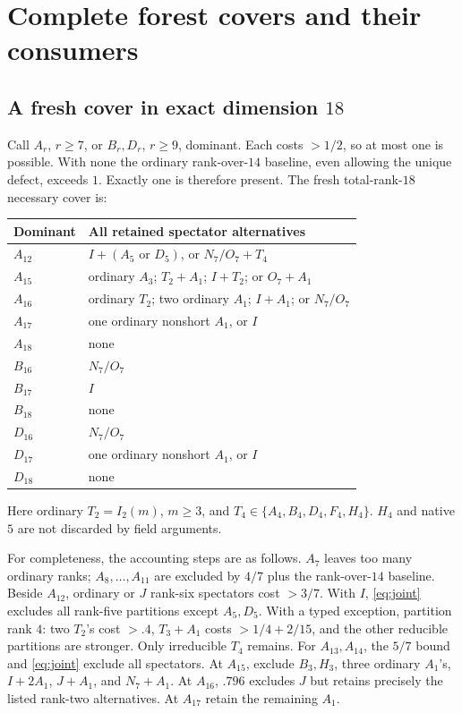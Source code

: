 \documentclass[11pt]{article}
\theoremstyle{definition}
\theoremstyle{remark}
\begin{document}
\section{Complete forest covers and their consumers}
\label{sec:forests}
\subsection[A fresh cover in exact dimension 18]{A fresh cover in exact dimension \(18\)}
Call \(A_r\), \(r\geq7\), or \(B_r,D_r\), \(r\geq9\),
dominant. Each costs \(>1/2\), so at most one is possible.
With none the ordinary rank-over-\(14\) baseline, even allowing
the unique defect, exceeds \(1\). Exactly one is therefore present.
The fresh total-rank-\(18\) necessary cover is:
\begin{center}\small
\begin{tabular}{p{.14\linewidth}p{.75\linewidth}}
\toprule
Dominant&All retained spectator alternatives\\ \midrule
\(A_{12}\)&\(I+(A_5\text{ or }D_5)\), or \(N_7/O_7+T_4\)\\
\(A_{15}\)&ordinary \(A_3\); \(T_2+A_1\); \(I+T_2\); or \(O_7+A_1\)\\
\(A_{16}\)&ordinary \(T_2\); two ordinary \(A_1\); \(I+A_1\); or \(N_7/O_7\)\\
\(A_{17}\)&one ordinary nonshort \(A_1\), or \(I\)\\
\(A_{18}\)&none\\
\(B_{16}\)&\(N_7/O_7\)\\
\(B_{17}\)&\(I\)\\
\(B_{18}\)&none\\
\(D_{16}\)&\(N_7/O_7\)\\
\(D_{17}\)&one ordinary nonshort \(A_1\), or \(I\)\\
\(D_{18}\)&none\\ \bottomrule
\end{tabular}
\end{center}
Here ordinary \(T_2=I_2(m)\), \(m\geq3\), and
\(T_4\in\{A_4,B_4,D_4,F_4,H_4\}\).
\(H_4\) and native \(5\) are not discarded by field arguments.

For completeness, the accounting steps are as follows.
\(A_7\) leaves too many ordinary ranks;
\(A_8,\ldots,A_{11}\) are excluded by \(4/7\) plus
the rank-over-\(14\) baseline.
Beside \(A_{12}\), ordinary or \(J\) rank-six spectators cost
\(>3/7\). With \(I\), \eqref{eq:joint} excludes all rank-five
partitions except \(A_5,D_5\). With a typed exception, partition
rank \(4\): two \(T_2\)'s cost \(>.4\), \(T_3+A_1\) costs
\(>1/4+2/15\), and the other reducible partitions are stronger.
Only irreducible \(T_4\) remains. For \(A_{13},A_{14}\),
the \(5/7\) bound and \eqref{eq:joint} exclude all spectators.
At \(A_{15}\), exclude \(B_3,H_3\), three ordinary \(A_1\)'s,
\(I+2A_1\), \(J+A_1\), and \(N_7+A_1\).
At \(A_{16}\), \(.796\) excludes \(J\) but retains precisely
the listed rank-two alternatives. At \(A_{17}\) retain the
remaining \(A_1\).
\end{document}
